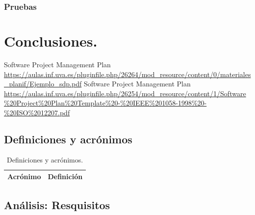 \documentclass[a4paper,11pt, twoside]{article}
\begin{document}
\subsubsection{Pruebas}
\section{Conclusiones.}
\newpage
\renewcommand\refname{Bibliografía}
\begin{thebibliography}{99}
    Software Project Management Plan \url{https://aulas.inf.uva.es/pluginfile.php/26264/mod_resource/content/0/materiales_planif/Ejemplo_sdp.pdf}
    Software Project  
Management Plan \url{https://aulas.inf.uva.es/pluginfile.php/26254/mod_resource/content/1/Software\%20Project\%20Plan\%20Template\%20-\%20IEEE\%201058-1998\%20-\%20ISO\%2012207.pdf}
\end{thebibliography}

\newpage

\begin{appendices}
\addappheadtotoc
{}
\appendixpage

\renewcommand\thesubsection{Anexo \Roman{subsection}}

\subsection{Definiciones y acrónimos}\label{ANEXOI}
\begin{table}[!h]
        \centering
        \begin{tabular}{|c|c|}
        \hline
        \textbf{\large Acrónimo} & \textbf{\large Definición}\\
        \hline
        \end{tabular}
        \caption{Definiciones y acrónimos.}
        \label{ta:defyacr}
    \end{table}
    
    \subsection{Análisis: Resquisitos}\label{ANEXOII}
    
\end{appendices}
\end{document}

